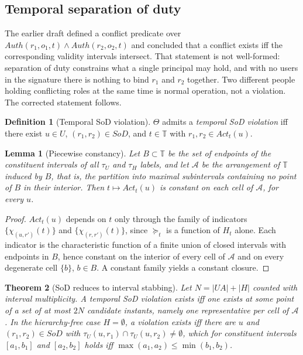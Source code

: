 \documentclass[11pt]{article}
\theoremstyle{definition}
\newtheorem{definition}{Definition}
\theoremstyle{plain}
\newtheorem{theorem}{Theorem}
\newtheorem{lemma}[theorem]{Lemma}
\theoremstyle{remark}
\newcommand{\Auth}{\mathit{Auth}}
\newcommand{\Act}{\mathit{Act}}
\newcommand{\SoD}{\mathit{SoD}}
\newcommand{\Tdom}{\mathbb{T}}
\begin{document}
\subsection{Temporal separation of duty}

The earlier draft defined a conflict predicate over
$\Auth(r_1,o_1,t) \land \Auth(r_2,o_2,t)$ and concluded that a conflict exists
iff the corresponding validity intervals intersect. That statement is not
well-formed: separation of duty constrains what a single principal may hold, and
with no users in the signature there is nothing to bind $r_1$ and $r_2$
together. Two different people holding conflicting roles at the same time is
normal operation, not a violation. The corrected statement follows.

\begin{definition}[Temporal SoD violation]
$\Theta$ admits a \emph{temporal SoD violation} iff there exist $u \in U$,
$(r_1,r_2) \in \SoD$, and $t \in \Tdom$ with
$r_1, r_2 \in \Act_t(u)$.
\end{definition}

\begin{lemma}[Piecewise constancy]
\label{lem:breakpoints}
Let $B \subset \Tdom$ be the set of endpoints of the constituent intervals of
all $\tau_U$ and $\tau_H$ labels, and let $\mathcal{A}$ be the arrangement of
$\Tdom$ induced by $B$, that is, the partition into maximal subintervals
containing no point of $B$ in their interior. Then $t \mapsto \Act_t(u)$ is
constant on each cell of $\mathcal{A}$, for every $u$.
\end{lemma}

\begin{proof}
$\Act_t(u)$ depends on $t$ only through the family of indicators
$\{\chi_{(u,r')}(t)\}$ and $\{\chi_{(r,r')}(t)\}$, since $\succeq_t$ is a
function of $H_t$ alone. Each indicator is the characteristic function of a
finite union of closed intervals with endpoints in $B$, hence constant on the
interior of every cell of $\mathcal{A}$ and on every degenerate cell
$\{b\}$, $b \in B$. A constant family yields a constant closure.
\end{proof}

\begin{theorem}[SoD reduces to interval stabbing]
\label{thm:sod}
Let $N = |UA| + |H|$ counted with interval multiplicity. A temporal SoD
violation exists iff one exists at some point of a set of at most $2N$
candidate instants, namely one representative per cell of $\mathcal{A}$. In the
hierarchy-free case $H = \emptyset$, a violation exists iff there are
$u$ and $(r_1,r_2) \in \SoD$ with
$\tau_U(u,r_1) \cap \tau_U(u,r_2) \neq \emptyset$, which for constituent
intervals $[a_1,b_1]$ and $[a_2,b_2]$ holds iff
$\max(a_1,a_2) \le \min(b_1,b_2)$.
\end{theorem}
\end{document}
